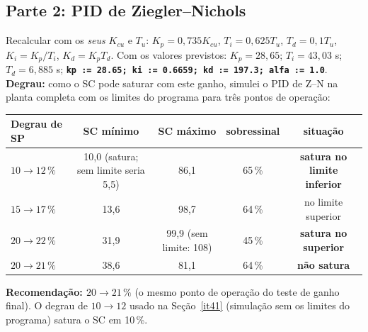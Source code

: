 \subsection{Parte 2: PID de Ziegler--Nichols}
Recalcular com os \emph{seus} $K_{cu}$ e $T_u$: $K_p=0{,}735K_{cu}$, $T_i=0{,}625T_u$, $T_d=0{,}1T_u$, $K_i=K_p/T_i$, $K_d=K_pT_d$. Com os valores previstos: $K_p=28{,}65$; $T_i=43{,}03$ s; $T_d=6{,}885$ s; \textbf{\texttt{kp := 28.65; ki := 0.6659; kd := 197.3; alfa := 1.0}}.
\textbf{Degrau:} como o SC pode saturar com este ganho, simulei o PID de Z--N na planta completa com os limites do programa para três pontos de operação:
\begin{center}\small\begin{tabular}{lcccc}\toprule Degrau de SP & SC mínimo & SC máximo & sobressinal & situação\\\midrule
$10\to12\,\%$ & 10,0 (satura; sem limite seria 5,5) & 86,1 & 65\,\% & \textbf{satura no limite inferior}\\
$15\to17\,\%$ & 13,6 & 98,7 & 64\,\% & no limite superior\\
$20\to22\,\%$ & 31,9 & 99,9 (sem limite: 108) & 45\,\% & \textbf{satura no superior}\\
$20\to21\,\%$ & 38,6 & 81,1 & 64\,\% & \textbf{não satura}\\\bottomrule\end{tabular}\end{center}
\textbf{Recomendação: $20\to21\,\%$} (o mesmo ponto de operação do teste de ganho final). O degrau de $10\to12$ usado na Seção~\ref{it41} (simulação sem os limites do programa) satura o SC em 10\,\%.
